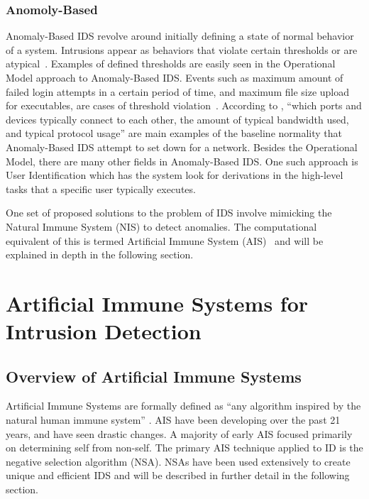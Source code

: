 \documentclass{umm-senior-sem}
\begin{document}
\subsubsection{Anomoly-Based}

Anomaly-Based IDS revolve around initially defining a state of normal behavior of a system. Intrusions appear as behaviors that violate certain thresholds or are atypical~\cite{IDSoverview:2011}.
Examples of defined thresholds are easily seen in the Operational Model approach to Anomaly-Based IDS. Events such as maximum amount of failed login attempts in a certain period of time, and maximum file size upload for executables, are cases of threshold violation~\cite{anomalyReview:2011}.
According to \cite{IDSimmune:2010}, ``which ports and devices typically connect to each other, the amount of typical bandwidth used, and typical protocol usage'' are main examples of the baseline normality that Anomaly-Based IDS attempt to set down for a network. Besides the Operational Model, there are many other fields in Anomaly-Based IDS. One such approach is User Identification which has the system look for derivations in the high-level tasks that a specific user typically executes.

One set of proposed solutions to the problem of IDS involve mimicking the Natural Immune System (NIS) to detect anomalies. The computational equivalent of this is termed Artificial Immune System (AIS)~\cite{greensmith_thesis:2007} and will be explained in depth in the following section.

\section{Artificial Immune Systems for Intrusion Detection}
\label{sec:Artificial Immune Systems for Intrusion Detection}
\subsection{Overview of Artificial Immune Systems}
Artificial Immune Systems are formally defined as ``any algorithm inspired by the natural human immune system'' \cite{evalAIS:2005}. AIS have been developing over the past 21 years, and have seen drastic changes. A majority of early AIS focused primarily on determining self from non-self.
The primary AIS technique applied to ID is the negative selection algorithm (NSA). NSAs have been used extensively to create unique and efficient IDS \cite{greensmith_thesis:2007} and will be described in further detail in the following section.
\end{document}
